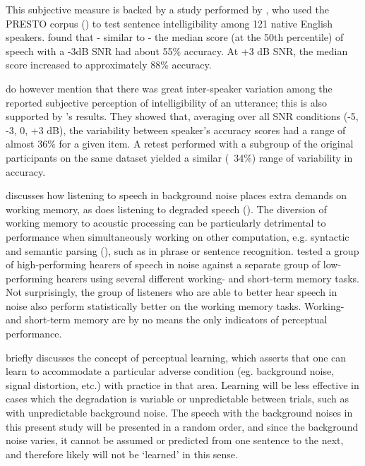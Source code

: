 \documentclass[dissertation,copyright]{uathesis}
\begin{document}
This subjective measure is backed by a study performed by \cite{gilbert:13}, who used the PRESTO corpus (\cite{garofolo:93}) to test sentence intelligibility among 121 native English speakers.  \cite{gilbert:13} found that - similar to \cite{ding:13} - the median score (at the 50th percentile) of speech with a -3dB SNR had about 55\% accuracy.  At +3 dB SNR, the median score increased to approximately 88\% accuracy.

\cite{ding:13} do however mention that there was great inter-speaker variation among the reported subjective perception of intelligibility of an utterance; this is also supported by \cite{gilbert:13}'s results. They showed that, averaging over all SNR conditions (-5, -3, 0, +3 dB), the variability between speaker's accuracy scores had a range of almost 36\% for a given item.  A retest performed with a subgroup of the original participants on the same dataset yielded a similar (~34\%) range of variability in accuracy.  

\cite{francis:10} discusses how listening to speech in background noise places extra demands on working memory, as does listening to degraded speech (\cite{francis:09}).  The diversion of working memory to acoustic processing can be particularly detrimental to performance when simultaneously working on other computation, e.g. syntactic and semantic parsing (\cite{caplan:99}), such as in phrase or sentence recognition. \cite{tamati:13} tested a group of high-performing hearers of speech in noise against a separate group of low-performing hearers using several different working- and short-term memory tasks.  Not surprisingly, the group of listeners who are able to better hear speech in noise also perform statistically better on the working memory tasks.  Working- and short-term memory are by no means the only indicators of perceptual performance.

\cite{mattys:12} briefly discusses the concept of perceptual learning, which asserts that one can learn to accommodate a particular adverse condition (eg. background noise, signal distortion, etc.) with practice in that area.  Learning will be less effective in cases which the degradation is variable or unpredictable between trials, such as with unpredictable background noise.  The speech with the background noises in this present study will be presented in a random order, and since the background noise varies, it cannot be assumed or predicted from one sentence to the next, and therefore likely will not be `learned' in this sense.
\end{document}
